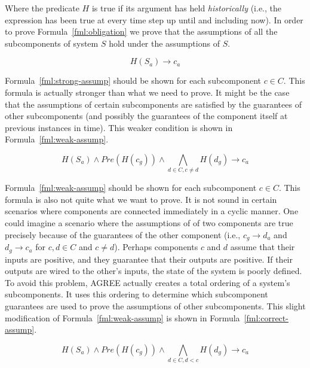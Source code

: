 \documentclass{llncs}
\begin{document}
Where the predicate $H$ is true if its argument has held \textit{historically} (i.e., the expression has been true at every time step up until and including now). In order to prove Formula~\ref{fml:obligation} we prove that the assumptions of all the subcomponents of system $S$ hold under the assumptions of $S$.

\begin{center}
\begin{equation}\label{fml:strong-assump}
H(S_a) \rightarrow c_a 
\end{equation}
\end{center}

Formula~\ref{fml:strong-assump} should be shown for each subcomponent $c \in C$. This formula is actually stronger than what we need to prove.  It might be the case that the assumptions of certain subcomponents are satisfied by the guarantees of other subcomponents (and possibly the guarantees of the component itself at previous instances in time).  This weaker condition is shown in Formula~\ref{fml:weak-assump}.

\begin{center}
\begin{equation}\label{fml:weak-assump}
 H(S_a) \wedge Pre(H(c_g))\wedge\bigwedge_{d \in C, c \neq d} H(d_g) \rightarrow c_a 
\end{equation}
\end{center}

Formula~\ref{fml:weak-assump} should be shown for each subcomponent $c \in C$.  This formula is also not quite what we want to prove.  It is not sound in certain scenarios where components are connected immediately in a cyclic manner.  One could imagine a scenario where the assumptions of of two components are true precisely because of the guarantees of the other component (i.e., $c_g \rightarrow d_a $ and $d_g \rightarrow c_a$ for $c,d \in C$ and $c \neq d$). Perhaps components $c$ and $d$ assume that their inputs are positive, and they guarantee that their outputs are positive.  If their outputs are wired to the other's inputs, the state of the system is poorly defined.  To avoid this problem, AGREE actually creates a total ordering of a system's subcomponents.  It uses this ordering to determine which subcomponent guarantees are used to prove the assumptions of other subcomponents.  This slight modification of Formula~\ref{fml:weak-assump} is shown in Formula~\ref{fml:correct-assump}.

\begin{center}
\begin{equation}\label{fml:correct-assump}
 H(S_a) \wedge Pre(H(c_g))\wedge\bigwedge_{d \in C, d < c} H(d_g) \rightarrow c_a 
\end{equation}
\end{center}
\end{document}
